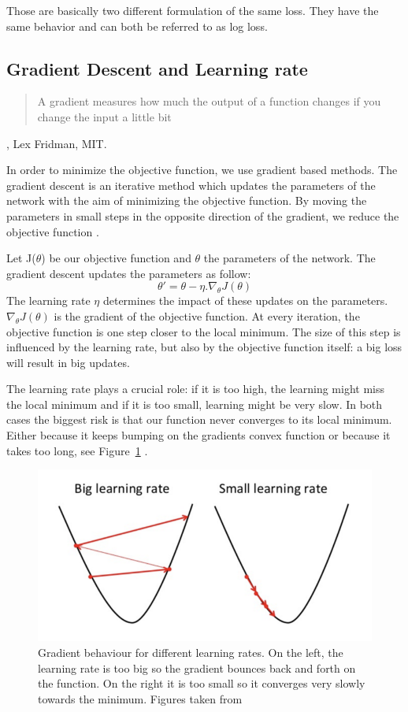 Those are basically two different formulation of the same loss. They have the same behavior and can both be referred to as log loss. 
\subsection{Gradient Descent and Learning rate} \label{sec:grad_lr}
 \begin{quote}
     A gradient measures how much the output of a function changes if you change the input a little bit
 \end{quote}, Lex Fridman, MIT. 


In order to minimize the objective function, we use gradient based methods. The gradient descent is an iterative method which updates the parameters of the network with the aim of minimizing the objective function. By moving the parameters in small steps in the opposite direction of the gradient, we reduce the objective function \cite{cs231n}. 

Let J(\(\theta\)) be our objective function and \(\theta\) the parameters of the network. The gradient descent updates the parameters as follow: \[\theta' = \theta - \eta . \nabla_\theta J(\theta) \] The learning rate \(\eta\) determines the impact of these updates on the parameters. \(\nabla_\theta J(\theta) \) is the gradient of the objective function. At every iteration, the objective function is one step closer to the local minimum. The size of this step is influenced by the learning rate, but also by the objective function itself: a big loss will result in big updates. 


The learning rate plays a crucial role: if it is too high, the learning might miss the local minimum and if it is too small, learning might be very slow. In both cases the biggest risk is that our function never converges to its local minimum. Either because it keeps bumping on the gradients convex function or because it takes too long, see Figure~\ref{fig:LR}  \cite{cs231n}.  
\begin{figure}[!htp]
    \centering
        \includegraphics[width=1\textwidth]{figures/02-LR}
        \caption[Gradient behaviour for different learning rates]{Gradient behaviour for different learning rates. On the left, the learning rate is too big so the gradient bounces back and forth on the function. On the right it is too small so it converges very slowly towards the minimum. Figures taken from \cite{gradient} }\label{fig:LR}
\end{figure}

